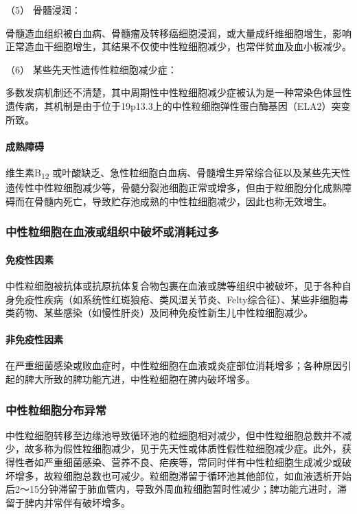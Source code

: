 \hypertarget{text00336.htmlux5cux23CHP12-2-1-1-1-5}{}
（5） 骨髓浸润：

骨髓造血组织被白血病、骨髓瘤及转移癌细胞浸润，或大量成纤维细胞增生，影响正常造血干细胞增生，其结果不仅使中性粒细胞减少，也常伴贫血及血小板减少。

\hypertarget{text00336.htmlux5cux23CHP12-2-1-1-1-6}{}
（6） 某些先天性遗传性粒细胞减少症：

多数发病机制还不清楚，其中周期性中性粒细胞减少症被认为是一种常染色体显性遗传病，其机制是由于位于19p13.3上的中性粒细胞弹性蛋白酶基因（ELA2）突变所致。

\paragraph{成熟障碍}

维生素B\textsubscript{12}
或叶酸缺乏、急性粒细胞白血病、骨髓增生异常综合征以及某些先天性遗传性中性粒细胞减少等，骨髓分裂池细胞正常或增多，但由于粒细胞分化成熟障碍而在骨髓内死亡，导致贮存池成熟的中性粒细胞减少，因此也称无效增生。

\subsubsection{中性粒细胞在血液或组织中破坏或消耗过多}

\paragraph{免疫性因素}

中性粒细胞被抗体或抗原抗体复合物包裹在血液或脾等组织中被破坏，见于各种自身免疫性疾病（如系统性红斑狼疮、类风湿关节炎、Felty综合征）、某些非细胞毒类药物、某些感染（如慢性肝炎）及同种免疫性新生儿中性粒细胞减少。

\paragraph{非免疫性因素}

在严重细菌感染或败血症时，中性粒细胞在血液或炎症部位消耗增多；各种原因引起的脾大所致的脾功能亢进，中性粒细胞在脾内破坏增多。

\subsubsection{中性粒细胞分布异常}

中性粒细胞转移至边缘池导致循环池的粒细胞相对减少，但中性粒细胞总数并不减少，故多称为假性粒细胞减少，见于先天性或体质性假性粒细胞减少症。此外，获得性者如严重细菌感染、营养不良、疟疾等，常同时伴有中性粒细胞生成减少或破坏增多，故粒细胞总数也可减少。粒细胞滞留于循环池其他部位，如血液透析开始后2～15分钟滞留于肺血管内，导致外周血粒细胞暂时性减少；脾功能亢进时，滞留于脾内并常伴有破坏增多。

